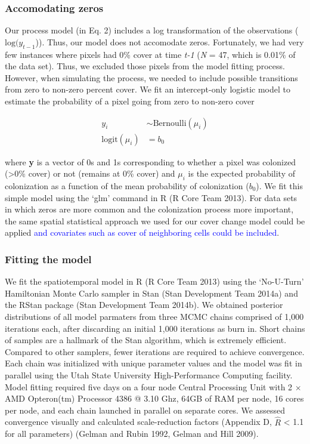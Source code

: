\documentclass[12pt,]{article}
\begin{document}
\subsubsection{Accomodating zeros}\label{accomodating-zeros}

Our process model (in Eq. 2) includes a log transformation of the
observations (\(\text{log}(y_{t-1}\))). Thus, our model does not
accomodate zeros. Fortunately, we had very few instances where pixels
had 0\% cover at time \emph{t-1} (\emph{N} = 47, which is 0.01\% of the
data set). Thus, we excluded those pixels from the model fitting
process. However, when simulating the process, we needed to include
possible transitions from zero to non-zero percent cover. We fit an
intercept-only logistic model to estimate the probability of a pixel
going from zero to non-zero cover

\vspace{-4em}\begin{align}
y_{i} &\sim \text{Bernoulli}(\mu_{i}) \\
\text{logit}(\mu_{i}) &= b_0
\end{align}\vspace{-4em}

where \textbf{y} is a vector of 0s and 1s corresponding to whether a
pixel was colonized (\textgreater{}0\% cover) or not (remains at 0\%
cover) and \(\mu_i\) is the expected probability of colonization as a
function of the mean probability of colonization (\(b_0\)). We fit this
simple model using the `glm' command in R (R Core Team 2013). For data
sets in which zeros are more common and the colonization process more
important, the same spatial statistical approach we used for our cover
change model could be applied
\textcolor{blue}{and covariates such as cover of neighboring cells could be included}.

\subsubsection{Fitting the model}\label{fitting-the-model}

We fit the spatiotemporal model in R (R Core Team 2013) using the
`No-U-Turn' Hamiltonian Monte Carlo sampler in Stan (Stan Development
Team 2014a) and the RStan package (Stan Development Team 2014b). We
obtained posterior distributions of all model parmaters from three MCMC
chains comprised of 1,000 iterations each, after discarding an initial
1,000 iterations as burn in. Short chains of samples are a hallmark of
the Stan algorithm, which is extremely efficient. Compared to other
samplers, fewer iterations are required to achieve convergence. Each
chain was initialized with unique parameter values and the model was fit
in parallel using the Utah State University High-Performance Computing
facility. Model fitting required five days on a four node Central
Processing Unit with 2 \(\times\) AMD Opteron(tm) Processor 4386 @ 3.10
Ghz, 64GB of RAM per node, 16 cores per node, and each chain launched in
parallel on separate cores. We assessed convergence visually and
calculated scale-reduction factors (Appendix D, \(\hat{R}\) \textless{}
1.1 for all parameters) (Gelman and Rubin 1992, Gelman and Hill 2009).
\end{document}
